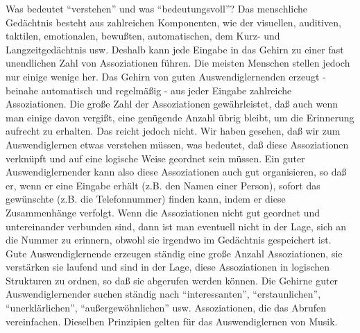 Was bedeutet \enquote{verstehen} und was \enquote{bedeutungsvoll}?
Das menschliche Gedächtnis besteht aus zahlreichen Komponenten, wie der visuellen, auditiven, taktilen, emotionalen, bewußten, automatischen, dem Kurz- und Langzeitgedächtnis usw.
Deshalb kann jede Eingabe in das Gehirn zu einer fast unendlichen Zahl von Assoziationen führen.
Die meisten Menschen stellen jedoch nur einige wenige her.
Das Gehirn von guten Auswendiglernenden erzeugt - beinahe automatisch und regelmäßig - aus jeder Eingabe zahlreiche Assoziationen.
Die große Zahl der Assoziationen gewährleistet, daß auch wenn man einige davon vergißt, eine genügende Anzahl übrig bleibt, um die Erinnerung aufrecht zu erhalten.
Das reicht jedoch nicht.
Wir haben gesehen, daß wir zum Auswendiglernen etwas verstehen müssen, was bedeutet, daß diese Assoziationen verknüpft und auf eine logische Weise geordnet sein müssen.
Ein guter Auswendiglernender kann also diese Assoziationen auch gut organisieren, so daß er, wenn er eine Eingabe erhält (z.B. den Namen einer Person), sofort das gewünschte (z.B. die Telefonnummer) finden kann, indem er diese Zusammenhänge verfolgt.
Wenn die Assoziationen nicht gut geordnet und untereinander verbunden sind, dann ist man eventuell nicht in der Lage, sich an die Nummer zu erinnern, obwohl sie irgendwo im Gedächtnis gespeichert ist.
Gute Auswendiglernende erzeugen ständig eine große Anzahl Assoziationen, sie verstärken sie laufend und sind in der Lage, diese Assoziationen in logischen Strukturen zu ordnen, so daß sie abgerufen werden können.
Die Gehirne guter Auswendiglernender suchen ständig nach \enquote{interessanten}, \enquote{erstaunlichen}, \enquote{unerklärlichen}, \enquote{außergewöhnlichen} usw. Assoziationen, die das Abrufen vereinfachen.
Dieselben Prinzipien gelten für das Auswendiglernen von Musik.

